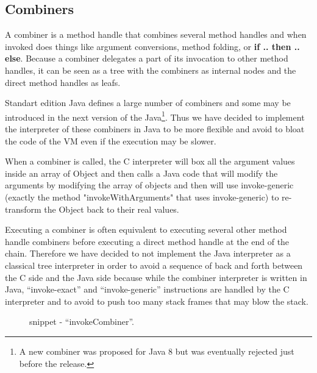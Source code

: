 \documentclass{sig-alternate}
\begin{document}


    \subsection{Combiners}
    \label{combiners}

      A combiner is a method handle that combines several method handles and when invoked
      does things like argument conversions, method folding, or {\bf if .. then .. else}.
      Because a combiner delegates a part of its invocation to other method handles,
      it can be seen as a tree with the combiners as internal nodes and the direct
      method handles as leafs.

      Standart edition Java defines a large number of combiners and some may be introduced in the next version
      of the Java\footnote{A new combiner was proposed for Java 8 but was eventually rejected just before the release.}.
      Thus we have decided to implement the interpreter of these combiners in Java
      to be more flexible and avoid to bloat the code of the VM even if the execution may be slower.
      
      When a combiner is called, the C interpreter will box all the argument values inside an array of Object
      and then calls a Java code that will modify the arguments by modifying the array
      of objects and then will use invoke-generic (exactly the method "invokeWithArguments" that uses invoke-generic)
      to re-transform the Object back to their real values.  

      Executing a combiner is often equivalent to executing several other method handle
      combiners before executing a direct method handle at the end of the chain.
      Therefore we have decided to not implement the Java interpreter as a classical
      tree interpreter in order to avoid a sequence of back and forth between the C side and the Java side
      because while the combiner interpreter is written in Java, ``invoke-exact'' and ``invoke-generic'' instructions
      are handled by the C interpreter and to avoid to push too many stack frames that may blow the stack.
      
      \begin{figure}[!ht]
        \centering \vspace{-1em}
        \caption{snippet - ``invokeCombiner''.}
        \label{implINTERP}
      \end{figure}
\end{document}
